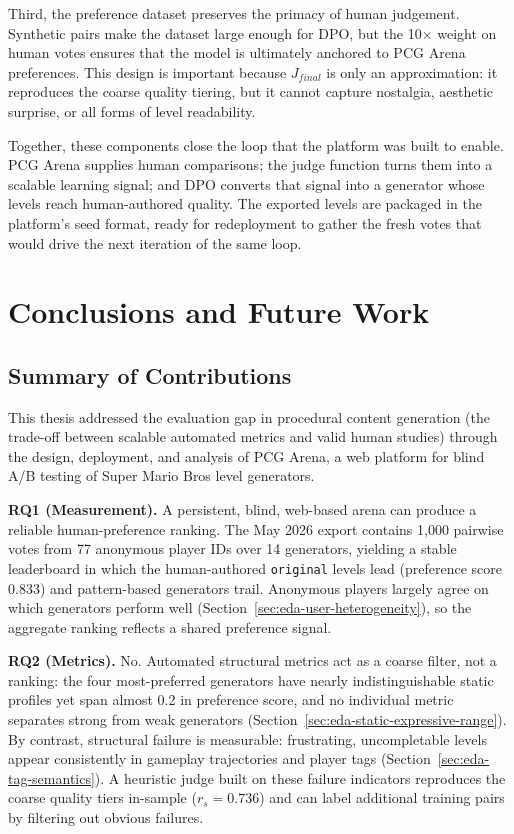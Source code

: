\documentclass[shortabstract, mgr, english]{iithesis}
\begin{document}
Third, the preference dataset preserves the primacy of human judgement. Synthetic
pairs make the dataset large enough for DPO, but the 10$\times$ weight on human
votes ensures that the model is ultimately anchored to PCG Arena preferences.
This design is important because $J_{final}$ is only an approximation: it
reproduces the coarse quality tiering, but it cannot capture nostalgia,
aesthetic surprise, or all forms of level readability.

Together, these components close the loop that the platform was
built to enable. PCG Arena supplies human comparisons; the judge function turns
them into a scalable learning signal; and DPO converts that signal into a
generator whose levels reach human-authored quality. The exported levels are
packaged in the platform's seed format, ready for redeployment to gather the
fresh votes that would drive the next iteration of the same loop.


\chapter{Conclusions and Future Work}
\label{ch:conclusions}


\section{Summary of Contributions}
\label{sec:conc-contributions}

This thesis addressed the evaluation gap in procedural
content generation (the trade-off between scalable automated
metrics and valid human studies) through the design,
deployment, and analysis of PCG Arena, a web platform for blind
A/B testing of Super Mario Bros level generators.

\textbf{RQ1 (Measurement).} A persistent, blind, web-based arena can
produce a reliable human-preference ranking. The May 2026 export contains
1,000 pairwise votes from 77 anonymous player IDs over 14 generators, yielding
a stable leaderboard in which the human-authored \texttt{original} levels lead
(preference score 0.833) and pattern-based generators trail. Anonymous players largely agree on which generators perform well
(Section~\ref{sec:eda-user-heterogeneity}), so the aggregate ranking reflects a shared
preference signal.

\textbf{RQ2 (Metrics).} No. Automated structural metrics act as a
coarse filter, not a ranking: the four most-preferred generators have nearly
indistinguishable static profiles yet span almost 0.2 in preference score, and
no individual metric separates strong from weak generators
(Section~\ref{sec:eda-static-expressive-range}). By contrast, structural failure is measurable: frustrating, uncompletable levels appear consistently in
gameplay trajectories and player tags (Section~\ref{sec:eda-tag-semantics}). A heuristic judge
built on these failure indicators reproduces the coarse quality tiers in-sample
($r_s = 0.736$) and can label additional training pairs by filtering out
obvious failures.
\end{document}
